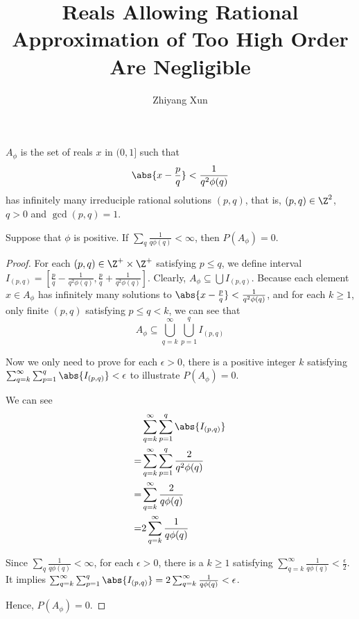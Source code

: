 
 
\author{Zhiyang Xun}
\title{Reals Allowing Rational Approximation of Too High Order Are Negligible}

     
\maketitle

\begin{definition}
    $A_\phi$ is the set of reals $x$ in $(0, 1]$ such that 
    \[ \abs{x - \frac{p}{q}} < \frac{1}{q^2\phi(q)} \] 
    has infinitely many irreduciple rational solutions $(p, q)$, that is, $(p, q) \in \Z^2$, $q > 0$ and $\gcd(p, q) = 1$. 
\end{definition}

\begin{theorem}
    Suppose that $\phi$ is positive. If $\sum_q \frac{1}{q\phi(q)} < \infty$, then $P (A_\phi) = 0$.
\end{theorem}     

\begin{proof}
    For each $(p, q) \in \Z^+ \times \Z^+$ satisfying $p \leq q$, we define interval 
    $I_{(p, q)} = [\frac{p}{q} - \frac{1}{q^2\phi(q)}, \frac{p}{q} + \frac{1}{q^2\phi(q)}]$.
    Clearly, $A_\phi \subseteq \bigcup I_{(p, q)}$.
    Because each element $x \in A_\phi$ has infinitely many solutions to $\abs{x - \frac{p}{q}} < \frac{1}{q^2\phi(q)}$, and for each $k \geq 1$, only finite $(p, q)$ satisfying $p \leq q < k$, we can see that \[
        A_\phi \subseteq \bigcup_{q=k}^\infty \bigcup_{p=1}^{q} I_{(p, q)} 
    \]

    Now we only need to prove for each $\epsilon > 0$, there is a positive integer $k$ satisfying $\sum_{q=k}^\infty \sum_{p=1}^{q} \abs{I_{(p, q)}} < \epsilon$ to illustrate $P (A_\phi) = 0$.

    We can see
    \begin{align*}
         &\sum_{q=k}^\infty \sum_{p=1}^{q} \abs{I_{(p, q)}} \\
        =&\sum_{q=k}^\infty \sum_{p=1}^{q} \frac{2}{q^2\phi(q)} \\
        =&\sum_{q=k}^\infty \frac{2}{q\phi(q)} \\
        =&2\sum_{q=k}^\infty \frac{1}{q\phi(q)} \\
    \end{align*}

    Since $\sum_q \frac{1}{q\phi(q)} < \infty$, for each $\epsilon > 0$, there is a $k \geq 1$ satisfying $\sum_{q=k}^\infty \frac{1}{q\phi(q)} < \frac{\epsilon}{2}$. It implies $\sum_{q=k}^\infty \sum_{p=1}^{q} \abs{I_{(p, q)}} = 2\sum_{q=k}^\infty \frac{1}{q\phi(q)} < \epsilon$.

    Hence, $P(A_\phi) = 0$.
    
\end{proof}

